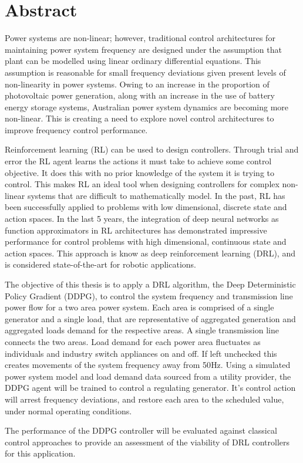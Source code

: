 \chapter*{Abstract} %
Power systems are non-linear; however, traditional control architectures for maintaining power system frequency are designed under the assumption that plant can be modelled using linear ordinary differential equations. This assumption is reasonable for small frequency deviations given present levels of non-linearity in power systems. Owing to an increase in the proportion of photovoltaic power generation, along with an increase in the use of battery energy storage systems, Australian power system dynamics are becoming more non-linear. This is creating a need to explore novel control architectures to improve frequency control performance.

Reinforcement learning (RL) can be used to design controllers. Through trial and error the RL agent learns the actions it must take to achieve some control objective. It does this with no prior knowledge of the system it is trying to control. This makes RL an ideal tool when designing controllers for complex non-linear systems that are difficult to mathematically model. In the past, RL has been successfully applied to problems with low dimensional, discrete state and action spaces. In the last 5 years, the integration of deep neural networks as function approximators in RL architectures has demonstrated impressive performance for control problems with high dimensional, continuous state and action spaces. This approach is know as deep reinforcement learning (DRL), and is considered state-of-the-art for robotic applications.

The objective of this thesis is to apply a DRL algorithm, the Deep Deterministic Policy Gradient (DDPG), to control the system frequency and transmission line power flow for a two area power system. Each area is comprised of a single generator and a single load, that are representative of aggregated generation and aggregated loads demand for the respective areas. A single transmission line connects the two areas. Load demand for each power area fluctuates as individuals and industry switch appliances on and off. If left unchecked this creates movements of the system frequency away from 50$\si{\hertz}$. Using a simulated power system model and load demand data sourced from a utility provider, the DDPG agent will be trained to control a regulating generator. It's control action will arrest frequency deviations, and restore each area to the scheduled value, under normal operating conditions.

The performance of the DDPG controller will be evaluated against classical control approaches to provide an assessment of the viability of DRL controllers for this application.